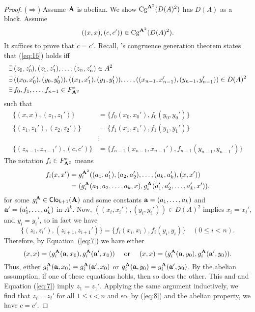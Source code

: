 \begin{proof}
  \noindent ($\Rightarrow$) Assume $\mathbf{A}$ is abelian. We show
  $\operatorname{Cg}^{\mathbf{A}^2}(D(A)^2)$ has $D(A)$ as a block.  Assume
  \begin{equation}
    \label{eq:16}
  ((x,x), (c,c')) \in \operatorname{Cg}^{\mathbf{A}^2}(D(A)^2).
  \end{equation}
  It suffices to prove that $c=c'$.  Recall, \malcev's congruence generation
  theorem states that (\ref{eq:16}) holds iff
  \begin{align*}
  \exists \,& (z_0,z_0'), (z_1,z_1'), \dots, (z_n,z_n') \in A^2\\
    \exists \,& ((x_0,x_0'), (y_0,y_0')), ((x_1,x_1'), (y_1,y_1')), \dots, 
    ((x_{n-1},x_{n-1}'), (y_{n-1},y_{n-1}')) \in D(A)^2\\
    \exists \, & f_0, f_1, \dots, f_{n-1}\in F^*_{\mathbf{A}^2}
  \end{align*}
  such that 
  \begin{align}
    \label{eq:7}
    \{(x, x),(z_1,z_1')\} &= \{f_0(x_0,x_0'), f_0(y_0,y_0')\}\\
\nonumber
     \{(z_1,z_1'),(z_2,z_2')\} &= \{f_1(x_1,x_1'), f_1(y_1,y_1')\}\\
\nonumber
     & \vdots\\
    \label{eq:8}
     \{(z_{n-1},z_{n-1}'),(c, c')\} &= \{f_{n-1}(x_{n-1},x_{n-1}'), f_{n-1}(y_{n-1},y_{n-1}')\}
 \end{align}
The notation $f_i\in F^*_{\mathbf{A}^2}$ means 
\begin{align*}
f_i(x, x') &= g_i^{\mathbf{A}^2}((a_1, a_1'), (a_2, a_2'), \dots, (a_k, a_k'), (x, x'))\\
&= (g_i^{\mathbf{A}}(a_1, a_2, \dots, a_k, x), g_i^{\mathbf{A}}(a_1', a_2', \dots, a_k', x')),
\end{align*}
for some $g_i^{\mathbf{A}} \in \operatorname{\mathsf{Clo}}_{k+1}(\mathbf{A})$ and some constants 
$\mathbf{a} = (a_1, \dots, a_k)$ and $\mathbf{a}' = (a_1', \dots, a_k')$ in $A^k$. 
Now, $((x_i,x_i'), (y_i,y_i'))\in D(A)^2$ implies 
$x_i=x_i'$, and $y_i=y_i'$, so in fact we have 
\[
     \{(z_i,z_i'),(z_{i+1},z_{i+1}')\} = \{f_i(x_i,x_i), f_i(y_i,y_i)\} \quad (0\leq i < n).
\]
Therefore, by Equation~(\ref{eq:7}) we have either 
\[
     (x,x)= (g_i^{\mathbf{A}}(\mathbf{a}, x_0), g_i^{\mathbf{A}}(\mathbf{a}', x_0)) \quad \text{ or } \quad 
     (x,x)= (g_i^{\mathbf{A}}(\mathbf{a}, y_0), g_i^{\mathbf{A}}(\mathbf{a}', y_0)).
\]
Thus, either $g_i^{\mathbf{A}}(\mathbf{a}, x_0) =  g_i^{\mathbf{A}}(\mathbf{a}', x_0)$ %
or $g_i^{\mathbf{A}}(\mathbf{a}, y_0) =  g_i^{\mathbf{A}}(\mathbf{a}', y_0)$.
By the abelian assumption, if one of these equations holds, then so does the
other. This and and Equation (\ref{eq:7}) imply $z_1 = z_1'$.  Applying the same
argument inductively, we find that $z_i = z_i'$ for all $1\leq i < n$ and so, by
(\ref{eq:8}) and the abelian property, we have $c= c'$.
\end{proof}


